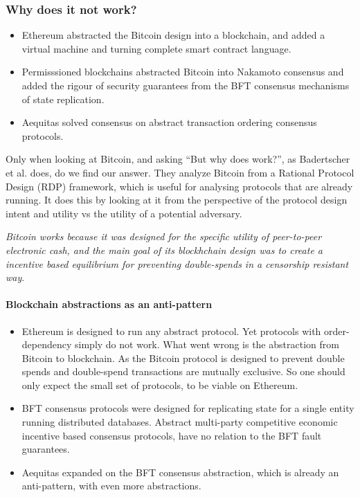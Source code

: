 \documentclass[12pt]{article}
\begin{document}
\subsubsection*{Why does it not work?} 
\begin{itemize}{}
\item Ethereum abstracted the Bitcoin design into a blockchain, and added a virtual machine and turning complete smart contract language. 
\item Permisssioned blockchains abstracted Bitcoin into Nakamoto consensus and added the rigour of security guarantees from the BFT consensus mechanisms of state replication. 
\item Aequitas solved consensus on abstract transaction ordering consensus protocols. 
\end{itemize}

Only when looking at Bitcoin, and asking ``But why does work?'', as Badertscher et al. \cite{badertscher2018but} does, do we find our answer. They analyze Bitcoin from a Rational Protocol Design (RDP) framework, which is useful for analysing protocols that are already running. It does this by looking at it from the perspective of the protocol design intent and utility vs the utility of a potential adversary.  

\textit{Bitcoin works because it was designed for the specific utility of peer-to-peer electronic cash, and the main goal of its blockhchain design was to create a incentive based equilibrium for preventing double-spends in a censorship resistant way}. \cite{Nakamoto}

\paragraph{Blockchain abstractions as an anti-pattern}
\begin{itemize}{}
\item Ethereum is designed to run any abstract protocol. Yet protocols with order-dependency simply do not work. What went wrong is the abstraction from Bitcoin to blockchain. As the Bitcoin protocol is designed to prevent double spends and double-spend transactions are mutually exclusive. So one should only expect the small set of protocols, to be viable on Ethereum.    

\item BFT consensus protocols were designed for replicating state for a single entity running distributed databases. Abstract multi-party competitive economic incentive based consensus protocols, have no relation to the BFT fault guarantees. 

\item Aequitas expanded on the BFT consensus abstraction, which is already an anti-pattern, with even more abstractions.  
\end{itemize}
\end{document}
